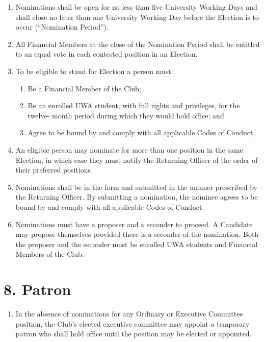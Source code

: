 \documentclass[12pt]{article}
\begin{document}
\begin{enumerate}[label=7.\arabic*]
\item Nominations shall be open for no less than five University Working Days and shall
close no later than one University Working Day before the Election is to occur
(``Nomination Period'').

\item All Financial Members at the close of the Nomination Period shall be entitled to an
equal vote in each contested position in an Election.

\item To be eligible to stand for Election a person must:
  \begin{enumerate}[label=7.7.\arabic*]
    \item Be a Financial Member of the Club;
    \item Be an enrolled UWA student, with full rights and privileges, for the twelve-
month period during which they would hold office; and
    \item Agree to be bound by and comply with all applicable Codes of Conduct.
  \end{enumerate}

\item An eligible person may nominate for more than one position in the same Election,
in which case they must notify the Returning Officer of the order of their preferred
positions.

\item Nominations shall be in the form and submitted in the manner prescribed by the
Returning Officer. By submitting a nomination, the nominee agrees to be bound by
and comply with all applicable Codes of Conduct.

\item Nominations must have a proposer and a seconder to proceed. A Candidate may
propose themselves provided there is a seconder of the nomination. Both the
proposer and the seconder must be enrolled UWA students and Financial
Members of the Club.
\end{enumerate}

\section{8. Patron}
\begin{enumerate}[label=8.\arabic*]
 \item In the absence of nominations for any Ordinary or Executive Committee position, the Club’s elected executive committee may appoint a temporary patron who shall hold office until the position may be elected or appointed.
\end{enumerate}
%
\end{document}
